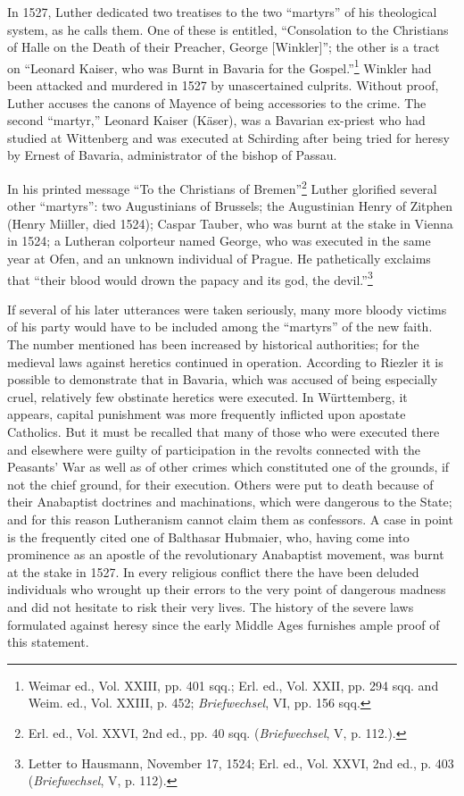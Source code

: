 In 1527, Luther dedicated two treatises to the two “martyrs” of his
theological system, as he calls them. One of these is entitled, “Consolation
to the Christians of Halle on the Death of their Preacher,
George [Winkler]”; the other is a tract on “Leonard Kaiser, who was
Burnt in Bavaria for the Gospel.”\footnote{Weimar ed., Vol. XXIII, pp. 401 sqq.; Erl. ed., Vol. XXII, pp. 294 sqq. and Weim. ed.,
Vol. XXIII, p. 452; \textit{Briefwechsel}, VI, pp. 156 sqq.}
 Winkler had been attacked and
murdered in 1527 by unascertained culprits. Without proof, Luther
accuses the canons of Mayence of being accessories to the crime. The
second “martyr,” Leonard Kaiser (Käser), was a Bavarian ex-priest
who had studied at Wittenberg and was executed at Schirding after
being tried for heresy by Ernest of Bavaria, administrator of the bishop
of Passau.

In his printed message “To the Christians of Bremen”\footnote{Erl. ed., Vol. XXVI, 2nd ed., pp. 40 sqq. (\textit{Briefwechsel}, V, p. 112.).}
 Luther
glorified several other “martyrs”: two Augustinians of Brussels; the
Augustinian Henry of Zitphen (Henry Miiller, died 1524); Caspar
Tauber, who was burnt at the stake in Vienna in 1524; a Lutheran
colporteur named George, who was executed in the same year at Ofen,
and an unknown individual of Prague. He pathetically exclaims that
“their blood would drown the papacy and its god, the devil.”\footnote
{Letter to Hausmann, November 17, 1524; Erl. ed., Vol. XXVI, 2nd ed., p. 403
(\textit{Briefwechsel}, V, p. 112).}

If several of his later utterances were taken seriously, many more
bloody victims of his party would have to be included among the
“martyrs” of the new faith. The number mentioned has been increased
by historical authorities; for the medieval laws against heretics continued
in operation. According to Riezler it is possible to demonstrate
that in Bavaria, which was accused of being especially cruel, relatively
few obstinate heretics were executed. In Württemberg, it appears,
capital punishment was more frequently inflicted upon apostate Catholics.
But it must be recalled that many of those who were executed
there and elsewhere were guilty of participation in the revolts connected
with the Peasants’ War as well as of other crimes which constituted one
of the grounds, if not the chief ground, for their execution. Others were
put to death because of their Anabaptist doctrines
and machinations, which were dangerous to the State; and for this
reason Lutheranism cannot claim them as confessors. A case in point is
the frequently cited one of Balthasar Hubmaier, who, having come
into prominence as an apostle of the revolutionary Anabaptist movement,
was burnt at the stake in 1527. In every religious conflict there the
have been deluded individuals who wrought up their errors to the very
point of dangerous madness and did not hesitate to risk their very
lives. The history of the severe laws formulated against heresy since
the early Middle Ages furnishes ample proof of this statement.


